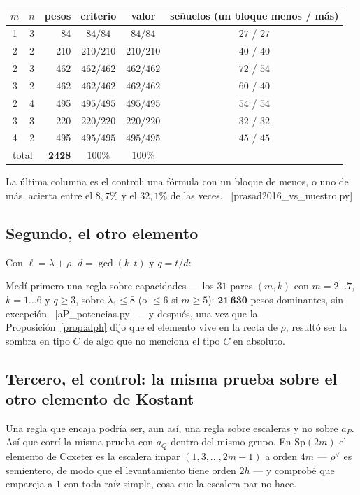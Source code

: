 \documentclass[11pt,a4paper]{article}
\newcommand{\Sp}{\mathrm{Sp}}
\newcommand{\rhoh}{\rho^{\vee}}
\newcommand{\ver}[1]{\unskip\penalty0\ \textcolor{azul}{\small\textsf{[#1]}}}
\begin{document}
\begin{center}
\small
{}
\begin{tabular}{ccrccc}
\toprule
\rowcolor{cabecera}$m$ & $n$ & pesos & criterio & valor & señuelos (un bloque menos / más)\\
\midrule
1&3& 84 & $84/84$ & $84/84$ & $27$ / $27$\\
2&2& 210 & $210/210$ & $210/210$ & $40$ / $40$\\
2&3& 462 & $462/462$ & $462/462$ & $72$ / $54$\\
3&2& 462 & $462/462$ & $462/462$ & $60$ / $40$\\
2&4& 495 & $495/495$ & $495/495$ & $54$ / $54$\\
3&3& 220 & $220/220$ & $220/220$ & $32$ / $32$\\
4&2& 495 & $495/495$ & $495/495$ & $45$ / $45$\\
\midrule
\multicolumn{2}{c}{total} & $\mathbf{2428}$ & $100\%$ & $100\%$ & \\
\bottomrule
\end{tabular}
\end{center}

\noindent La última columna es el control: una fórmula con un bloque de menos, o uno de más, acierta
entre el $8{,}7\%$ y el $32{,}1\%$ de las veces. \ver{prasad2016\_vs\_nuestro.py}


\subsection*{Segundo, el otro elemento}

Con $\ell=\lambda+\rho$, $d=\gcd(k,t)$ y $q=t/d$:


\noindent Medí primero una regla sobre capacidades --- los $31$ pares $(m,k)$ con $m=2\ldots7$,
$k=1\ldots6$ y $q\ge3$, sobre $\lambda_1\le8$ (o $\le6$ si $m\ge5$): $\mathbf{21\,630}$ pesos
dominantes, sin excepción \ver{aP\_potencias.py} --- y después, una vez que la
Proposición~\ref{prop:alph} dijo que el elemento vive en la recta de $\rho$, resultó ser la sombra
en tipo $C$ de algo que no menciona el tipo $C$ en absoluto.

\smallskip

\subsection*{Tercero, el control: la misma prueba sobre el otro elemento de Kostant}

Una regla que encaja podría ser, aun así, una regla sobre escaleras y no sobre $a_P$. Así que corrí
la misma prueba con $a_Q$ dentro del mismo grupo. En $\Sp(2m)$ el elemento de Coxeter es la escalera
impar $(1,3,\dots,2m-1)$ a orden $4m$ --- $\rhoh$ es semientero, de modo que el levantamiento tiene
orden $2h$ --- y comprobé que empareja a $1$ con toda raíz simple, cosa que la escalera par no hace.
\end{document}
